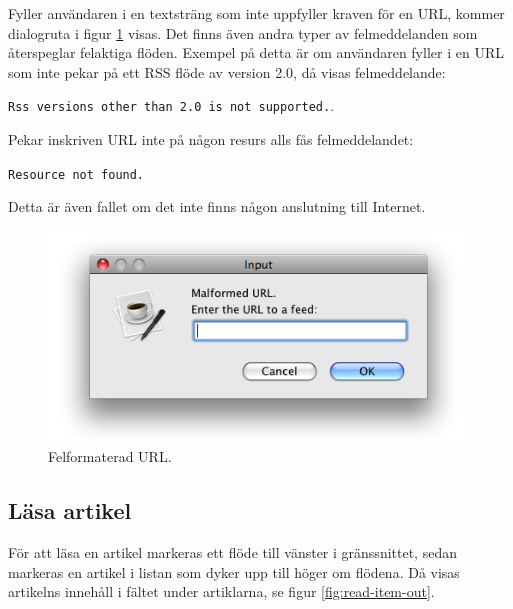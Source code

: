 \documentclass[titlepage, twoside, a4paper, 12pt]{article}
\begin{document}
Fyller användaren i en textsträng som inte uppfyller kraven för en
URL, kommer dialogruta i figur \ref{fig:malformed-url} visas. Det
finns även andra typer av felmeddelanden som återspeglar felaktiga
flöden. Exempel på detta är om användaren fyller i en URL som inte
pekar på ett RSS flöde av version 2.0, då visas felmeddelande:

\verb!Rss versions other than 2.0 is not supported.!.

Pekar inskriven URL inte på någon resurs alls fås felmeddelandet:

\verb!Resource not found.!

Detta är även fallet om det inte finns någon anslutning till
Internet.

\begin{figure}[!hbp]
  \begin{center}
    \includegraphics[width=110mm]{images/malformed-url.png}
    \caption{Felformaterad URL.}
    \label{fig:malformed-url}
  \end{center}
\end{figure}

\subsection{Läsa artikel}
För att läsa en artikel markeras ett flöde till vänster i
gränssnittet, sedan markeras en artikel i listan som dyker upp till
höger om flödena. Då visas artikelns innehåll i fältet under
artiklarna, se figur \ref{fig:read-item-out}.
\end{document}
